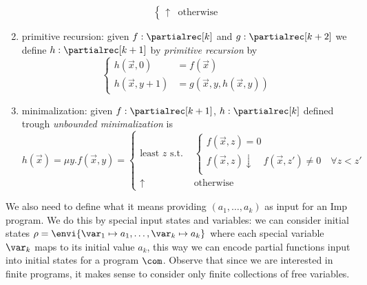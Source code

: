 \begin{definition}
\begin{enumerate}[label=(\arabic*)]
\begin{equation*}
\begin{cases}
        \uparrow & \text{otherwise}
      \end{cases}
    \end{equation*}
  \item\label{parec:2} primitive recursion: given
    \(f : \partialrec[k]\) and \(g : \partialrec[k+2]\) we define
    \(h : \partialrec[k+1]\) by \emph{primitive recursion} by
    \begin{equation*}
      \begin{cases}
        h(\vec{x}, 0) & = f(\vec{x}) \\
        h(\vec{x}, y + 1) & = g(\vec{x}, y, h(\vec{x}, y))
      \end{cases}
    \end{equation*}
  \item\label{parec:3} minimalization: given \(f : \partialrec[k+1]\),
    \(h : \partialrec[k]\) defined trough \emph{unbounded
      minimalization} is
    \begin{equation*}
      h(\vec{x}) = \mu y . f(\vec{x}, y) = \begin{cases}
        \text{least } z \text{ s.t. } & \begin{cases}
          f(\vec{x}, z) = 0 \\
	  f(\vec{x}, z) \downarrow \quad f(\vec{x},z')\neq 0 \quad \forall z < z' \\
	\end{cases} \\
        \uparrow                      & \text{otherwise}
      \end{cases}
    \end{equation*}
  \end{enumerate}
\end{definition}
\noindent
We also need to define what it means providing \((a_1, \dots, a_k)\)
as input for an Imp program. We do this by special input states and
variables: we can consider initial states
\(\rho = \envi{\var_1 \mapsto a_1, \dots, \var_k \mapsto a_k}\) where
each special variable \(\var_k\) maps to its initial value \(a_k\),
this way we can encode partial functions input into initial states for
a program \(\com\). Observe that since we are interested in finite
programs, it makes sense to consider only finite collections of free
variables.


